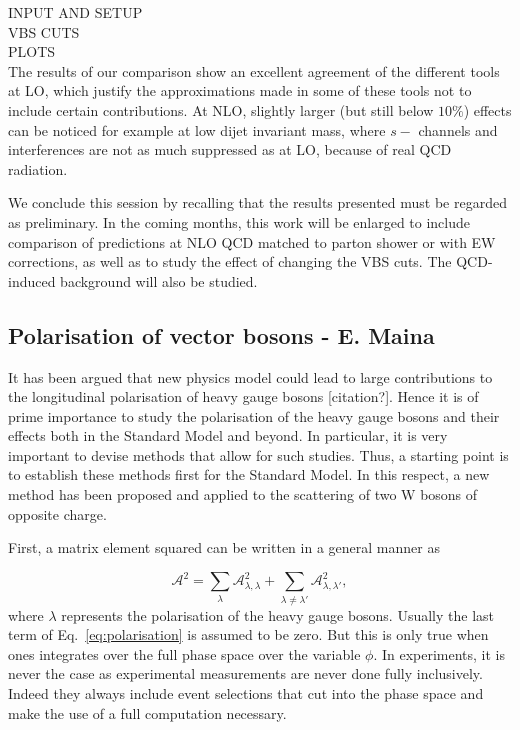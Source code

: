 %
INPUT AND SETUP\\
VBS CUTS\\
PLOTS\\
The results of our comparison show an excellent agreement of the different tools at LO, which justify the approximations made in some of these tools not to include certain 
contributions. At NLO, slightly larger (but still below $10\%$) effects can be noticed for example at low dijet invariant mass, where $s-$ channels and interferences are not
as much suppressed as at LO, because of real QCD radiation.


We conclude this session by recalling that the results presented must be regarded as preliminary.
In the coming months, this work will be enlarged to include comparison of predictions at NLO QCD matched to parton shower or with EW corrections, 
as well as to study the effect of changing 
the VBS cuts. The QCD-induced background will also be studied.

\subsection{Polarisation of vector bosons - E. Maina}

It has been argued that new physics model could lead to large contributions to the longitudinal polarisation of heavy gauge bosons [citation?].
Hence it is of prime importance to study the polarisation of the heavy gauge bosons and their effects both in the Standard Model and beyond.
In particular, it is very important to devise methods that allow for such studies.
Thus, a starting point is to establish these methods first for the Standard Model.
In this respect, a new method has been proposed and applied to the scattering of two W bosons of opposite charge.

First, a matrix element squared can be written in a general manner as

\begin{equation}
\label{eq:polarisation}
 \mathcal{A}^2 = \sum_{\lambda} \mathcal{A}^2_{\lambda, \lambda} + \sum_{\lambda \neq \lambda'} \mathcal{A}^2_{\lambda, \lambda'}, 
\end{equation}
%
where $\lambda$ represents the polarisation of the heavy gauge bosons.
Usually the last term of Eq.~\eqref{eq:polarisation} is assumed to be zero.
But this is only true when ones integrates over the full phase space over the variable $\phi$.
In experiments, it is never the case as experimental measurements are never done fully inclusively.
Indeed they always include event selections that cut into the phase space and make the use of a full computation necessary.

